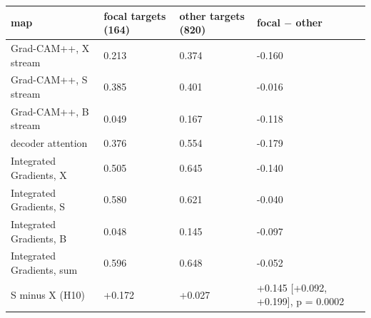\begin{tabular}{llll}
\toprule
map & focal targets (164) & other targets (820) & focal $-$ other \\
\midrule
Grad-CAM++, X stream & 0.213 & 0.374 & -0.160 \\
Grad-CAM++, S stream & 0.385 & 0.401 & -0.016 \\
Grad-CAM++, B stream & 0.049 & 0.167 & -0.118 \\
decoder attention & 0.376 & 0.554 & -0.179 \\
Integrated Gradients, X & 0.505 & 0.645 & -0.140 \\
Integrated Gradients, S & 0.580 & 0.621 & -0.040 \\
Integrated Gradients, B & 0.048 & 0.145 & -0.097 \\
Integrated Gradients, sum & 0.596 & 0.648 & -0.052 \\
S minus X (H10) & +0.172 & +0.027 & +0.145 [+0.092, +0.199], p = 0.0002 \\
\bottomrule
\end{tabular}
